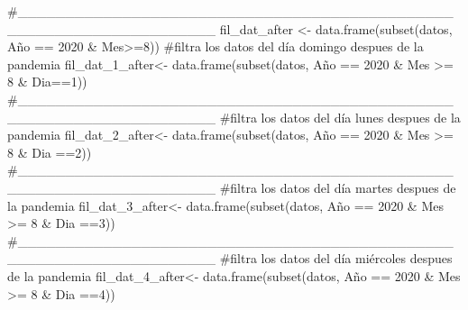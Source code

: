 \documentclass[
  us-letterpaper,
]{scrreprt}
\newenvironment{Shaded}{\begin{snugshade}}{\end{snugshade}}
\newcommand{\CommentTok}[1]{\textcolor[rgb]{0.37,0.37,0.37}{#1}}
\newcommand{\DecValTok}[1]{\textcolor[rgb]{0.68,0.00,0.00}{#1}}
\newcommand{\FunctionTok}[1]{\textcolor[rgb]{0.28,0.35,0.67}{#1}}
\newcommand{\NormalTok}[1]{\textcolor[rgb]{0.00,0.23,0.31}{#1}}
\newcommand{\OtherTok}[1]{\textcolor[rgb]{0.00,0.23,0.31}{#1}}
\newcommand{\SpecialCharTok}[1]{\textcolor[rgb]{0.37,0.37,0.37}{#1}}
\theoremstyle{plain}
\theoremstyle{plain}
\theoremstyle{definition}
\theoremstyle{remark}
\begin{document}
\begin{Shaded}
\begin{Highlighting}[]
\CommentTok{\#\_\_\_\_\_\_\_\_\_\_\_\_\_\_\_\_\_\_\_\_\_\_\_\_\_\_\_\_\_\_\_\_\_\_\_\_\_\_\_\_\_\_\_\_\_\_\_\_\_\_\_\_\_\_\_\_\_\_\_\_\_\_\_\_\_\_\_\_}
\NormalTok{fil\_dat\_after }\OtherTok{\textless{}{-}} \FunctionTok{data.frame}\NormalTok{(}\FunctionTok{subset}\NormalTok{(datos, Año }\SpecialCharTok{==} \DecValTok{2020} \SpecialCharTok{\&}\NormalTok{ Mes}\SpecialCharTok{\textgreater{}=}\DecValTok{8}\NormalTok{))}
\CommentTok{\#filtra los datos del día domingo despues de la pandemia}
\NormalTok{fil\_dat\_1\_after}\OtherTok{\textless{}{-}} \FunctionTok{data.frame}\NormalTok{(}\FunctionTok{subset}\NormalTok{(datos, }
\NormalTok{                                    Año }\SpecialCharTok{==} \DecValTok{2020} \SpecialCharTok{\&}\NormalTok{ Mes }\SpecialCharTok{\textgreater{}=} \DecValTok{8} \SpecialCharTok{\&}\NormalTok{ Dia}\SpecialCharTok{==}\DecValTok{1}\NormalTok{))}
\CommentTok{\#\_\_\_\_\_\_\_\_\_\_\_\_\_\_\_\_\_\_\_\_\_\_\_\_\_\_\_\_\_\_\_\_\_\_\_\_\_\_\_\_\_\_\_\_\_\_\_\_\_\_\_\_\_\_\_\_\_\_\_\_\_\_\_\_\_\_\_\_}
\CommentTok{\#filtra los datos del día lunes despues de la pandemia}
\NormalTok{fil\_dat\_2\_after}\OtherTok{\textless{}{-}} \FunctionTok{data.frame}\NormalTok{(}\FunctionTok{subset}\NormalTok{(datos,}
\NormalTok{                                    Año }\SpecialCharTok{==} \DecValTok{2020} \SpecialCharTok{\&}\NormalTok{ Mes }\SpecialCharTok{\textgreater{}=} \DecValTok{8} \SpecialCharTok{\&}\NormalTok{ Dia }\SpecialCharTok{==}\DecValTok{2}\NormalTok{))}
\CommentTok{\#\_\_\_\_\_\_\_\_\_\_\_\_\_\_\_\_\_\_\_\_\_\_\_\_\_\_\_\_\_\_\_\_\_\_\_\_\_\_\_\_\_\_\_\_\_\_\_\_\_\_\_\_\_\_\_\_\_\_\_\_\_\_\_\_\_\_\_\_}
\CommentTok{\#filtra los datos del día martes despues de la pandemia}
\NormalTok{fil\_dat\_3\_after}\OtherTok{\textless{}{-}} \FunctionTok{data.frame}\NormalTok{(}\FunctionTok{subset}\NormalTok{(datos,}
\NormalTok{                                    Año }\SpecialCharTok{==} \DecValTok{2020} \SpecialCharTok{\&}\NormalTok{ Mes }\SpecialCharTok{\textgreater{}=} \DecValTok{8} \SpecialCharTok{\&}\NormalTok{ Dia }\SpecialCharTok{==}\DecValTok{3}\NormalTok{))}
\CommentTok{\#\_\_\_\_\_\_\_\_\_\_\_\_\_\_\_\_\_\_\_\_\_\_\_\_\_\_\_\_\_\_\_\_\_\_\_\_\_\_\_\_\_\_\_\_\_\_\_\_\_\_\_\_\_\_\_\_\_\_\_\_\_\_\_\_\_\_\_\_}
\CommentTok{\#filtra los datos del día miércoles despues de la pandemia}
\NormalTok{fil\_dat\_4\_after}\OtherTok{\textless{}{-}} \FunctionTok{data.frame}\NormalTok{(}\FunctionTok{subset}\NormalTok{(datos,}
\NormalTok{                                    Año }\SpecialCharTok{==} \DecValTok{2020} \SpecialCharTok{\&}\NormalTok{ Mes }\SpecialCharTok{\textgreater{}=} \DecValTok{8} \SpecialCharTok{\&}\NormalTok{ Dia }\SpecialCharTok{==}\DecValTok{4}\NormalTok{))}

\end{Highlighting}
\end{Shaded}
\end{document}
